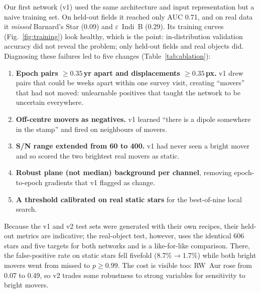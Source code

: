 \documentclass[10pt,twocolumn]{article}
\newcommand{\SN}{S/N}
\newcommand{\epsIndiB}{$\varepsilon$~Indi~B}
\begin{document}
Our first network (v1) used the same architecture and input representation but a naive training set.
On held-out fields it reached only AUC 0.71, and on real data it \emph{missed} Barnard's Star (0.09) and
\epsIndiB{} (0.29). Its training curves (Fig.~\ref{fig:training}) look healthy, which is the point: in-distribution
validation accuracy did not reveal the problem; only held-out fields and real objects did.
Diagnosing these failures led to five changes (Table~\ref{tab:ablation}):
\begin{enumerate}
  \item \textbf{Epoch pairs $\geq0.35$\,yr apart and displacements $\geq0.35$\,px.} v1 drew pairs that could
        be weeks apart within one survey visit, creating ``movers'' that had not moved: unlearnable
        positives that taught the network to be uncertain everywhere.
  \item \textbf{Off-centre movers as negatives.} v1 learned ``there is a dipole somewhere in the stamp''
        and fired on neighbours of movers.
  \item \textbf{\SN{} range extended from 60 to 400.} v1 had never seen a bright mover and so scored the two
        brightest real movers as static.
  \item \textbf{Robust plane (not median) background per channel}, removing epoch-to-epoch gradients that v1
        flagged as change.
  \item \textbf{A threshold calibrated on real static stars} for the best-of-nine local search.
\end{enumerate}
Because the v1 and v2 test sets were generated with their own recipes, their held-out metrics are
indicative; the real-object test, however, uses the identical 606 stars and five targets for both
networks and is a like-for-like comparison. There, the false-positive rate on static stars fell
fivefold (8.7\%$\to$1.7\%) while both bright movers went from missed to $p\geq0.99$. The cost is visible
too: RW~Aur rose from 0.07 to 0.49, so v2 trades some robustness to strong variables for sensitivity to
bright movers.
\end{document}
